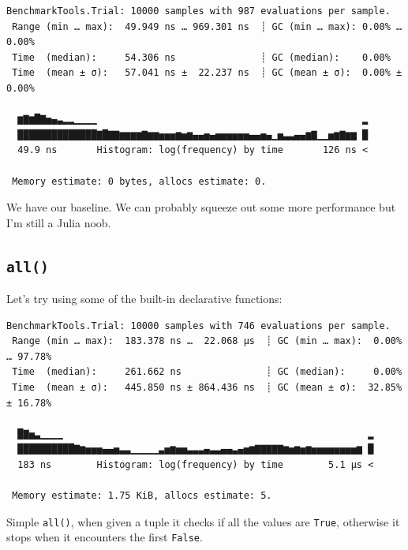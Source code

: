 \documentclass[
  a4paper,
  DIV=11,
  numbers=noendperiod]{scrreprt}
\newenvironment{Shaded}{\begin{snugshade}}{\end{snugshade}}
\newcommand{\FloatTok}[1]{\textcolor[rgb]{0.68,0.00,0.00}{#1}}
\newcommand{\FunctionTok}[1]{\textcolor[rgb]{0.28,0.35,0.67}{#1}}
\newcommand{\NormalTok}[1]{\textcolor[rgb]{0.00,0.23,0.31}{#1}}
\newcommand{\OperatorTok}[1]{\textcolor[rgb]{0.37,0.37,0.37}{#1}}
\newcommand{\PreprocessorTok}[1]{\textcolor[rgb]{0.68,0.00,0.00}{#1}}
\begin{document}
\begin{verbatim}
BenchmarkTools.Trial: 10000 samples with 987 evaluations per sample.
 Range (min … max):  49.949 ns … 969.301 ns  ┊ GC (min … max): 0.00% … 0.00%
 Time  (median):     54.306 ns               ┊ GC (median):    0.00%
 Time  (mean ± σ):   57.041 ns ±  22.237 ns  ┊ GC (mean ± σ):  0.00% ± 0.00%

  ▆▇▆█▇▅▄▃▂▂▁▁▁▁                                               ▂
  ██████████████▇█▇▇▆▆▆▆▇▆▆▅▅▅▆▅▆▄▄▅▄▅▅▅▅▅▅▄▄▅▄▁▅▃▃▄▄▆▇▁▁▅▆▇▆▆ █
  49.9 ns       Histogram: log(frequency) by time       126 ns <

 Memory estimate: 0 bytes, allocs estimate: 0.
\end{verbatim}

We have our baseline. We can probably squeeze out some more performance
but I'm still a Julia noob.

\subsection{\texorpdfstring{\texttt{all()}}{all()}}\label{all}

Let's try using some of the built-in declarative functions:

\begin{Shaded}
\end{Shaded}

\begin{verbatim}
BenchmarkTools.Trial: 10000 samples with 746 evaluations per sample.
 Range (min … max):  183.378 ns …  22.068 μs  ┊ GC (min … max):  0.00% … 97.78%
 Time  (median):     261.662 ns               ┊ GC (median):     0.00%
 Time  (mean ± σ):   445.850 ns ± 864.436 ns  ┊ GC (mean ± σ):  32.85% ± 16.78%

  █▇▅▃▁▁▁▁                                                      ▂
  ██████████▇▆▅▅▅▄▄▅▃▃▁▁▁▁▁▃▅▆▅▅▃▃▃▄▃▃▄▄▃▄▅▆▇▇▇▇▇▆▅▆▅▆▅▅▅▅▅▅▅▅▆ █
  183 ns        Histogram: log(frequency) by time        5.1 μs <

 Memory estimate: 1.75 KiB, allocs estimate: 5.
\end{verbatim}

Simple \texttt{all()}, when given a tuple it checks if all the values
are \texttt{True}, otherwise it stops when it encounters the first
\texttt{False}.
\end{document}
